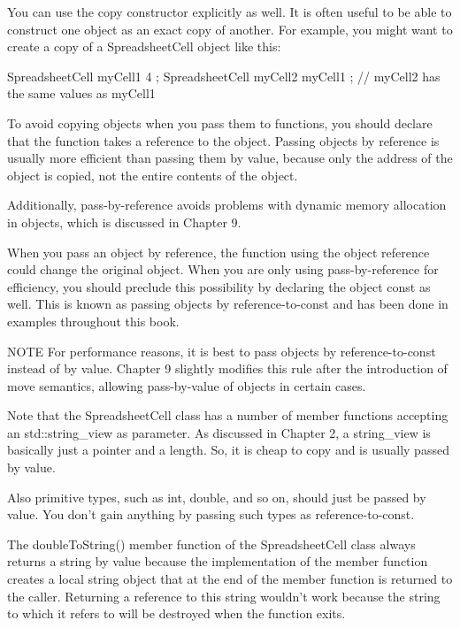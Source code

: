 
You can use the copy constructor explicitly as well. It is often useful to be able to construct one object as an exact copy of another. For example, you might want to create a copy of a SpreadsheetCell object like this:

\begin{cpp}
SpreadsheetCell myCell1 { 4 };
SpreadsheetCell myCell2 { myCell1 }; // myCell2 has the same values as myCell1
\end{cpp}


To avoid copying objects when you pass them to functions, you should declare that the function takes a reference to the object. Passing objects by reference is usually more efficient than passing them by value, because only the address of the object is copied, not the entire contents of the object.

Additionally, pass-by-reference avoids problems with dynamic memory allocation in objects, which is discussed in Chapter 9.

When you pass an object by reference, the function using the object reference could change the original object. When you are only using pass-by-reference for efficiency, you should preclude this possibility by declaring the object const as well. This is known as passing objects by reference-to-const and has been done in examples throughout this book.

\begin{myNotic}{NOTE}
For performance reasons, it is best to pass objects by reference-to-const instead of by value. Chapter 9 slightly modifies this rule after the introduction of move semantics, allowing pass-by-value of objects in certain cases.
\end{myNotic}

Note that the SpreadsheetCell class has a number of member functions accepting an std::string\_view as parameter. As discussed in Chapter 2, a string\_view is basically just a pointer and a length. So, it is cheap to copy and is usually passed by value.

Also primitive types, such as int, double, and so on, should just be passed by value. You don’t gain anything by passing such types as reference-to-const.

The doubleToString() member function of the SpreadsheetCell class always returns a string by value because the implementation of the member function creates a local string object that at the end of the member function is returned to the caller. Returning a reference to this string wouldn’t work because the string to which it refers to will be destroyed when the function exits.

